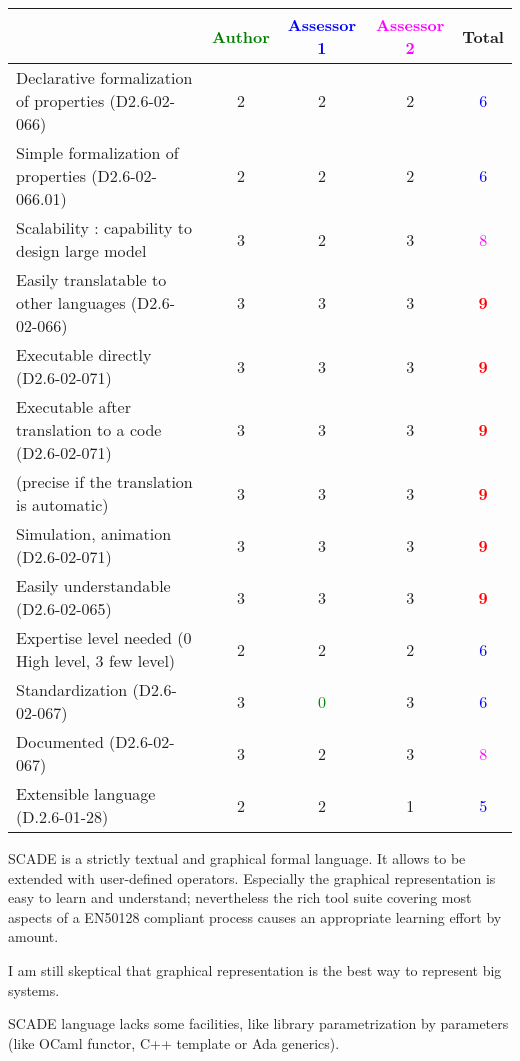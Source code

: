 \begin{tabular}{|l | c | c | c | c|}
\hline
& \textcolor{green}{Author} & \textcolor{blue}{Assessor 1} & \textcolor{magenta}{Assessor 2} & Total \\
\hline
Declarative formalization of properties (D2.6-02-066) &
2  & 2    &2 & \textcolor{blue}{6} \\
\hline
Simple formalization of properties (D2.6-02-066.01) &
2 & 2    &2 & \textcolor{blue}{6} \\
\hline
Scalability : capability to design large model &  3
& 2    &3 & \textcolor{magenta}{8} \\
\hline
Easily translatable to other languages (D2.6-02-066) &
3  & 3    &3 & \textcolor{red}{\textbf{9}} \\
\hline
Executable directly (D2.6-02-071) & 3     & 3    &3 & \textcolor{red}{\textbf{9}} \\
\hline
Executable after translation to a code (D2.6-02-071) &
3& 3    &3 & \textcolor{red}{\textbf{9}} \\
(precise if the translation is automatic) &  3& 3    &3 & \textcolor{red}{\textbf{9}} \\
\hline
Simulation, animation (D2.6-02-071) &  3 & 3    &3 & \textcolor{red}{\textbf{9}} \\
\hline
Easily understandable (D2.6-02-065) &  3& 3    &3 & \textcolor{red}{\textbf{9}} \\
\hline
Expertise level needed (0 High level, 3 few level) &
2 & 2    &2 & \textcolor{blue}{6} \\
\hline
Standardization (D2.6-02-067) &  3& \textcolor{green}{0} &3 & \textcolor{blue}{6} \\
\hline
Documented (D2.6-02-067) &  3 & 2    &3 & \textcolor{magenta}{8} \\
\hline
Extensible language (D.2.6-01-28) &  2& 2    &1 & \textcolor{blue}{5} \\
\hline
\end{tabular}
\begin{author_comment}
SCADE is a strictly textual and graphical formal language. It allows to be extended with user-defined operators. Especially the graphical representation is easy to learn and understand; nevertheless the rich tool suite covering most aspects of a EN50128 compliant process causes an appropriate learning effort by amount.
\end{author_comment}


\begin{assessor1}
  I am still skeptical that graphical representation is the best way
  to represent big systems.

  SCADE language lacks some facilities, like library parametrization
  by parameters (like OCaml functor, C++ template or Ada generics).
\end{assessor1}


